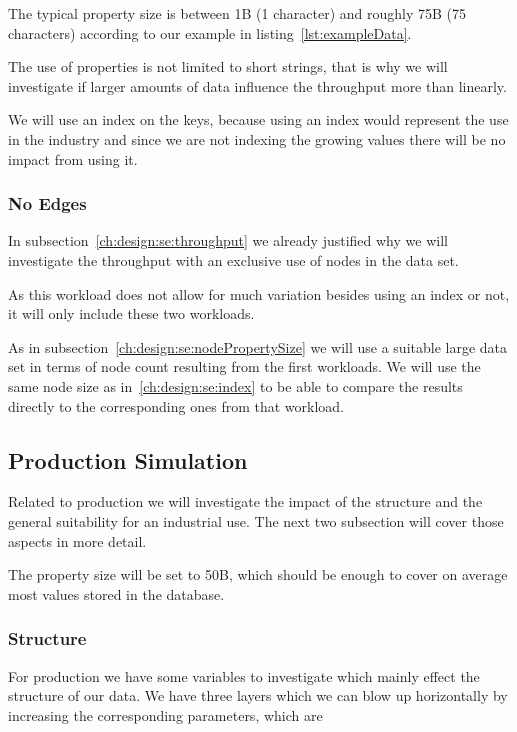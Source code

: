 The typical property size is between 1B (1 character) and roughly 75B (75 characters) according to our example in listing~\ref{lst:exampleData}.

The use of properties is not limited to short strings,
that is why we will investigate if larger amounts of data influence the throughput more than linearly.

We will use an index on the keys,
because using an index would represent the use in the industry and since we are not indexing the growing values there will be no impact from using it.

\subsubsection{No Edges}
\label{ch:design:se:noEdges}
In subsection~\ref{ch:design:se:throughput} we already justified why we will investigate the throughput with an exclusive use of nodes in the data set.

As this workload does not allow for much variation besides using an index or not,
it will only include these two workloads.

As in subsection~\ref{ch:design:se:nodePropertySize} we will use a suitable large data set in terms of node count resulting from the first workloads.
We will use the same node size as in~\ref{ch:design:se:index} to be able to compare the results directly to the corresponding ones from that workload.

\subsection{Production Simulation}
\label{ch:design:se:productionSimulation}
Related to production we will investigate the impact of the structure and the general suitability for an industrial use.
The next two subsection will cover those aspects in more detail.

The property size will be set to 50B,
which should be enough to cover on average most values stored in the database.

\subsubsection{Structure}
For production we have some variables to investigate which mainly effect the structure of our data.
We have three layers which we can blow up horizontally by increasing the corresponding parameters,
which are

